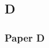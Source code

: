 \documentclass[11pt]{beamer} %
\begin{document}
\subsection{D}
\begin{frame}
 \frametitle{Paper D}
\begin{center}
\end{center}
\end{frame}


\end{document}
